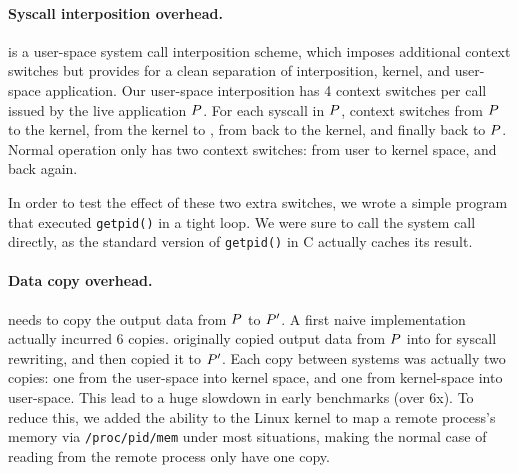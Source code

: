 \paragraph{Syscall interposition overhead.} \tachyon is a user-space
system call interposition scheme, which imposes additional context
switches but provides for a clean separation of interposition, kernel,
and user-space application.  Our user-space interposition has 4 context
switches per call issued by the live application $P$. For each
syscall in $P$, \tachyon context switches from $P$ to
the kernel, from the kernel to \tachyon, from \tachyon back to the
kernel, and finally back to $P$. Normal operation only has two
context switches: from user to kernel space, and back again.


In order to test the effect of these two extra switches, we wrote a simple
program that executed \texttt{getpid()} in a tight loop.
We were sure to call the system call directly, as the standard version of
\texttt{getpid()} in C actually caches its result.


\paragraph{Data copy overhead.} \tachyon needs to copy the output data
from $P$ to $P'$.  A first naive implementation
actually incurred 6 copies.  \tachyon originally copied output data
from $P$ into \tachyon for syscall rewriting, and then copied
it to $P'$.  Each copy between systems was actually two
copies: one from the user-space into kernel space, and one from
kernel-space into user-space. This lead to a huge slowdown in early
benchmarks (over 6x).  To reduce this, we added the ability to the
Linux kernel to map a remote process's memory via
\texttt{/proc/pid/mem} under most situations, making the normal case
of reading from the remote process only have one copy.


